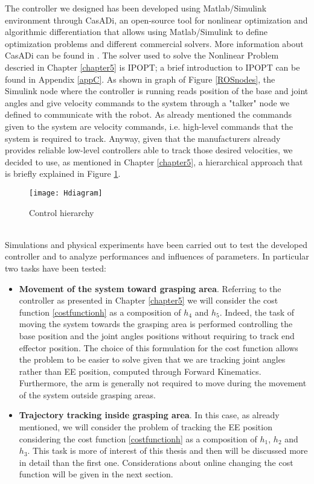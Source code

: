 The controller we designed has been developed using Matlab/Simulink environment through CasADi, an open-source tool for nonlinear optimization and algorithmic differentiation that allows using Matlab/Simulink to define optimization problems and different commercial solvers. More information about CasADi can be found in \cite{Andersson2018}. The solver used to solve the Nonlinear Problem descried in Chapter \ref{chapter5} is IPOPT; a brief introduction to IPOPT can be found in Appendix \ref{appC}. As shown in graph of Figure \ref{ROSnodes}, the Simulink node where the controller is running reads position of the base and joint angles and give velocity commands to the system through a "talker" node we defined to communicate with the robot. As already mentioned the commands given to the system are velocity commands, i.e. high-level commands that the system is required to track. Anyway, given that the manufacturers already provides reliable low-level controllers able to track those desired velocities, we decided to use, as mentioned in Chapter \ref{chapter5}, a hierarchical approach that is briefly explained in Figure \ref{Hdiagram}.  
\begin{figure}[h!]
 
		\texttt{[image: Hdiagram]}
		\centering
		
		\caption{Control hierarchy} 
	
\label{Hdiagram}
\end{figure}
\\
Simulations and physical experiments have been carried out to test the developed controller and to analyze performances and influences of parameters. In particular two tasks have been tested: 

\begin{itemize}
	\item \textbf{Movement of the system toward grasping area}. Referring to the controller as presented in Chapter \ref{chapter5} we will consider the cost function \ref{costfunctionh} as a composition of $h_4$ and $h_5$. Indeed, the task of moving the system towards the grasping area is performed controlling the base position and the joint angles positions without requiring to track end effector position. The choice of this formulation for the cost function allows the problem to be easier to solve given that we are tracking joint angles rather than EE position, computed through Forward Kinematics. Furthermore, the arm is generally not required to move during the movement of the system outside grasping areas.

	\item \textbf{Trajectory tracking inside grasping area}. In this case, as already mentioned, we will consider the problem of tracking the EE position considering the cost function \ref{costfunctionh} as a composition of $h_1$, $h_2$ and $h_3$. This task is more of interest of this thesis and then will be discussed more in detail than the first one. Considerations about online changing the cost function will be given in the next section. 
\end{itemize}
